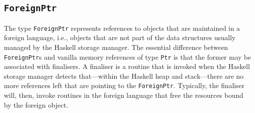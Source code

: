 \documentclass[a4paper,twosides]{article}
\newcommand{\code}[1]{\texttt{#1}}      %
\begin{document}
\subsection{\code{ForeignPtr}}
\label{sec:ForeignPtr}

The type \code{ForeignPtr} represents references to objects that are
maintained in a foreign language, i.e., objects that are not part of the data
structures usually managed by the Haskell storage manager. The essential
difference between \code{ForeignPtr}s and vanilla memory references of type
\code{Ptr} is that the former may be associated with finalisers.  A finaliser
is a routine that is invoked when the Haskell storage manager detects
that---within the Haskell heap and stack---there are no more references left
that are pointing to the \code{ForeignPtr}.  Typically, the finaliser will,
then, invoke routines in the foreign language that free the resources bound by
the foreign object.  
\end{document}
